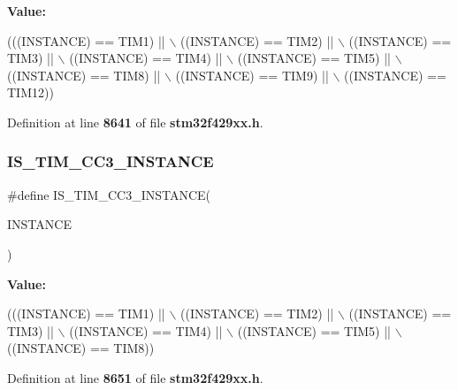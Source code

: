 {\bfseries Value\+:}
\begin{DoxyCode}
(((INSTANCE) == TIM1) || \(\backslash\)
                                       ((INSTANCE) == TIM2) || \(\backslash\)
                                       ((INSTANCE) == TIM3) || \(\backslash\)
                                       ((INSTANCE) == TIM4) || \(\backslash\)
                                       ((INSTANCE) == TIM5) || \(\backslash\)
                                       ((INSTANCE) == TIM8) || \(\backslash\)
                                       ((INSTANCE) == TIM9) || \(\backslash\)
                                       ((INSTANCE) == TIM12))
\end{DoxyCode}


Definition at line \textbf{ 8641} of file \textbf{ stm32f429xx.\+h}.

\mbox{\label{group__Exported__macros_ga0c37cb8f925fd43622cce7a4c00fd95e}} 
\subsubsection{I\+S\+\_\+\+T\+I\+M\+\_\+\+C\+C3\+\_\+\+I\+N\+S\+T\+A\+N\+CE}
{\footnotesize\ttfamily \#define I\+S\+\_\+\+T\+I\+M\+\_\+\+C\+C3\+\_\+\+I\+N\+S\+T\+A\+N\+CE(\begin{DoxyParamCaption}\item[{}]{I\+N\+S\+T\+A\+N\+CE }\end{DoxyParamCaption})}

{\bfseries Value\+:}
\begin{DoxyCode}
(((INSTANCE) == TIM1) || \(\backslash\)
                                         ((INSTANCE) == TIM2) || \(\backslash\)
                                         ((INSTANCE) == TIM3) || \(\backslash\)
                                         ((INSTANCE) == TIM4) || \(\backslash\)
                                         ((INSTANCE) == TIM5) || \(\backslash\)
                                         ((INSTANCE) == TIM8))
\end{DoxyCode}


Definition at line \textbf{ 8651} of file \textbf{ stm32f429xx.\+h}.

\mbox{\label{group__Exported__macros_gae72b7182a73d81c33196265b31091c07}} 
